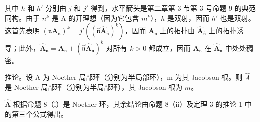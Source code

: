 其中 \(h\) 和 \(h'\) 分别由 \(j\) 和 \(j'\) 得到，水平箭头是第二章第 3 节第 3 号命题 9 的典范同构。由于 \(n^k\) 是 A 的开理想（因为它包含 \(m^k\)），\(h\) 是双射，因而 \(h'\) 也是双射。这首先表明 \((\mathfrak{n}\mathbf{A}_{\mathfrak{n}})^k = j'((\hat{\mathfrak{n}}\hat{\mathbf{A}}_{\hat{\mathfrak{n}}})^k)\)，因而 \(\mathbf{A}_{\mathfrak{n}}\) 上的拓扑由 \(\hat{\mathbf{A}}_{\hat{\mathfrak{n}}}\) 上的拓扑诱导；此外，\(\hat{\mathbf{A}}_{\hat{\mathfrak{n}}} = \mathbf{A}_{\mathfrak{n}} + (\hat{\mathfrak{n}}\hat{\mathbf{A}}_{\hat{\mathfrak{n}}})^k\) 对所有 \(k > 0\) 都成立，因而 \(\mathbf{A}_{\mathfrak{n}}\) 在 \(\hat{\mathbf{A}}_{\hat{\mathfrak{n}}}\) 中处处稠密。

推论。设 A 为 Noether 局部环（分别为半局部环），m 为其 Jacobson 根。则 \(\hat{A}\) 是 Noether 局部环（分别为半局部环），其 Jacobson 根为 \(\hat{m}\)。

\(\hat{\mathbf{A}}\) 根据命题 8（i）是 Noether 环，其余结论由命题 8（ii）及定理 3 的推论 1 中的第三个公式得出。

